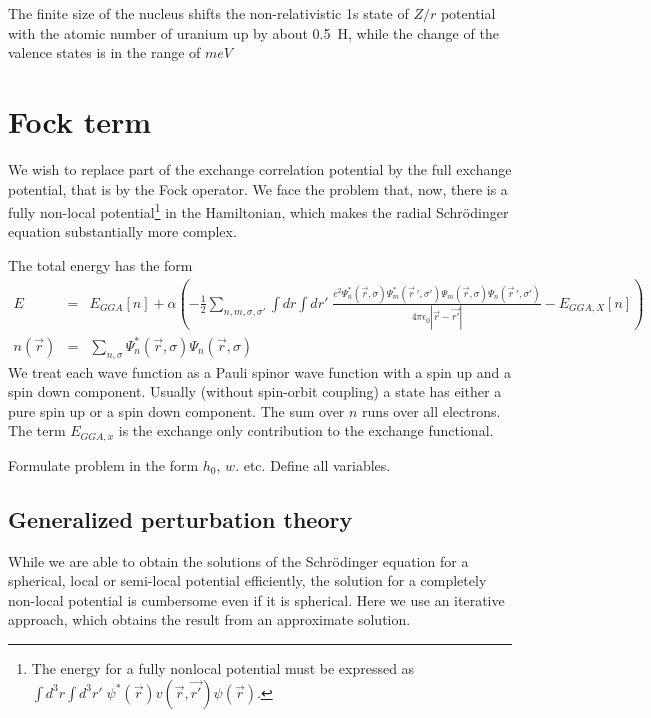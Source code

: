 \documentclass[11pt,a4paper]{report}
\begin{document}
The finite size of the nucleus shifts the non-relativistic 1s state of
$Z/r$ potential with the atomic number of uranium up by about 0.5~H,
while the change of the valence states is in the range of $meV$

\section{Fock term}
We wish to replace part of the exchange correlation potential by the
full exchange potential, that is by the Fock operator. We face the
problem that, now, there is a fully non-local potential\footnote{The
  energy for a fully nonlocal potential must be expressed as $\int
  d^3r\int d^3r'\;
  \psi^*(\vec{r})v(\vec{r},\vec{r'})\psi(\vec{r})$.} in the
  Hamiltonian, which makes the radial Schr\"odinger equation
  substantially more complex.

The total energy has the form
\begin{eqnarray*}
E&=&E_{GGA}[n]+\alpha\left(-\frac{1}{2}\sum_{n,m,\sigma,\sigma'}
\int dr\int dr'\;
\frac{e^2\Psi^*_n(\vec{r},\sigma)\Psi^*_m(\vec{r}\,',\sigma')
\Psi_m(\vec{r},\sigma)\Psi_n(\vec{r}\,',\sigma')}{4\pi\epsilon_0|\vec{r}-\vec{r'}|}
-E_{GGA,X}[n]\right)
\\
n(\vec{r})&=&\sum_{n,\sigma}\Psi_n^*(\vec{r},\sigma)\Psi_n(\vec{r},\sigma)
\end{eqnarray*}
We treat each wave function as a Pauli spinor wave function
with a spin up and a spin down component. Usually (without spin-orbit
coupling) a state has either a pure spin up or a spin down component.
The sum over $n$ runs over all electrons.
The term $E_{GGA,x}$ is the exchange only contribution to the exchange
functional.

Formulate problem in the form $h_0$, $w$. etc. Define all variables.
\subsection{Generalized perturbation theory}
\label{sec:gpt}
While we are able to obtain the solutions of the Schr\"odinger
equation for a spherical, local or semi-local potential efficiently,
the solution for a completely non-local potential is cumbersome even
if it is spherical. Here we use an iterative approach, which obtains
the result from an approximate solution. 
\end{document}
